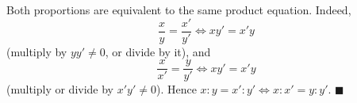 Both proportions are equivalent to the same product equation. Indeed,
\[\dfrac xy=\dfrac{x'}{y'}\iff xy'=x'y\]
(multiply by $yy'\ne0$, or divide by it), and
\[\dfrac{x}{x'}=\dfrac{y}{y'}\iff xy'=x'y\]
(multiply or divide by $x'y'\ne0$). Hence $x:y=x':y'\iff x:x'=y:y'$. $\blacksquare$
